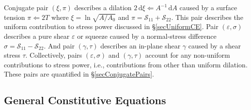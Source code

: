 Conjugate pair $( \xi , \pi )$ describes a dilation $2 \, \mathrm{d} \xi \Leftarrow A^{-1} \, \mathrm{d} A$ caused by a surface tension $\pi \Leftarrow 2T$ where $\xi = \ln \sqrt{A / \! A_0}$ and $\pi = \mathcal{S}_{11} + \mathcal{S}_{22}$.  This pair describes the uniform contribution to stress power discussed in \S\ref{secUniformCE}.  Pair $( \varepsilon , \sigma )$ describes a pure shear $\varepsilon$ or squeeze caused by a normal-stress difference $\sigma = \mathcal{S}_{11} - \mathcal{S}_{22}$.  And pair $( \gamma , \tau )$ describes an in-plane shear $\gamma$ caused by a shear stress $\tau$. Collectively, pairs $( \varepsilon , \sigma )$ and $( \gamma , \tau )$ account for any non-uniform contributions to stress power, i.e., contributions from other than uniform dilation.  These pairs are quantified in \S\ref{secConjugatePairs}.

\subsection{General Constitutive Equations}

